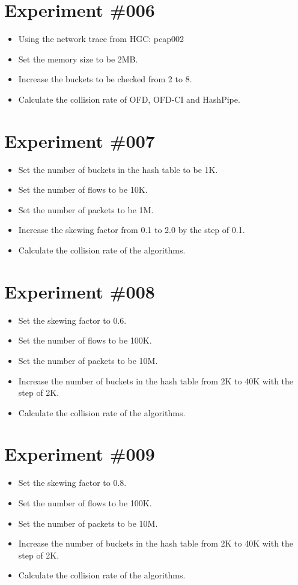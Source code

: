 \documentclass[10pt, conference, letterpaper]{IEEEtran}
\begin{document}
\section*{Experiment \#006}
\begin{itemize}
	\item Using the network trace from HGC: pcap002
	\item Set the memory size to be 2MB.
	\item Increase the buckets to be checked from 2 to 8.
	\item Calculate the collision rate of OFD, OFD-CI and HashPipe.
\end{itemize}

\section*{Experiment \#007}
\begin{itemize}
	\item Set the number of buckets in the hash table to be 1K.
	\item Set the number of flows to be 10K.
	\item Set the number of packets to be 1M.
	\item Increase the skewing factor from 0.1 to 2.0 by the step of 0.1.
	\item Calculate the collision rate of the algorithms.
\end{itemize}

\section*{Experiment \#008}
\begin{itemize}
	\item Set the skewing factor to 0.6.
	\item Set the number of flows to be 100K.
	\item Set the number of packets to be 10M.
	\item Increase the number of buckets in the hash table from 2K to 40K with the step of 2K.
	\item Calculate the collision rate of the algorithms.
\end{itemize}


\section*{Experiment \#009}
\begin{itemize}
	\item Set the skewing factor to 0.8.
	\item Set the number of flows to be 100K.
	\item Set the number of packets to be 10M.
	\item Increase the number of buckets in the hash table from 2K to 40K with the step of 2K.
	\item Calculate the collision rate of the algorithms.
\end{itemize}
\end{document}
